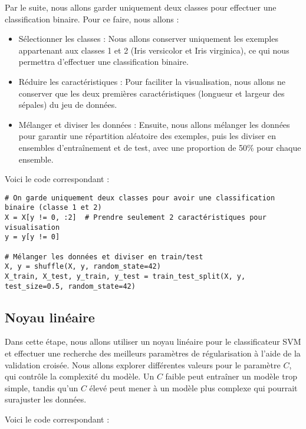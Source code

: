 \documentclass{article}
\begin{document}
Par le suite, nous allons garder uniquement deux classes pour effectuer
une classification binaire. Pour ce faire, nous allons :\\
\begin{itemize}
\item Sélectionner les classes : Nous allons conserver uniquement les 
exemples appartenant aux classes 1 et 2 (Iris versicolor et Iris
virginica), ce qui nous permettra d'effectuer une classification 
binaire.\\
\item Réduire les caractéristiques : Pour faciliter la visualisation,
nous allons ne conserver que les deux premières caractéristiques 
(longueur et largeur des sépales) du jeu de données.\\
\item Mélanger et diviser les données : Ensuite, nous allons mélanger les 
données pour garantir une répartition aléatoire des exemples, puis les 
diviser en ensembles d'entraînement et de test, avec une proportion de 
50\% pour chaque ensemble.\\
\end{itemize}

Voici le code correspondant :

\begin{verbatim}
# On garde uniquement deux classes pour avoir une classification binaire (classe 1 et 2)
X = X[y != 0, :2]  # Prendre seulement 2 caractéristiques pour visualisation
y = y[y != 0]

# Mélanger les données et diviser en train/test
X, y = shuffle(X, y, random_state=42)
X_train, X_test, y_train, y_test = train_test_split(X, y, test_size=0.5, random_state=42)
\end{verbatim}
\subsection{Noyau linéaire}

Dans cette étape, nous allons utiliser un noyau linéaire pour le
classificateur SVM et effectuer une recherche des meilleurs paramètres de 
régularisation à l'aide de la validation croisée. Nous allons explorer 
différentes valeurs pour le paramètre $C$, qui contrôle la complexité du 
modèle. Un $C$ faible peut entraîner un modèle trop simple, tandis qu'un 
$C$ élevé peut mener à un modèle plus complexe qui pourrait surajuster 
les données.

Voici le code correspondant :
\end{document}
